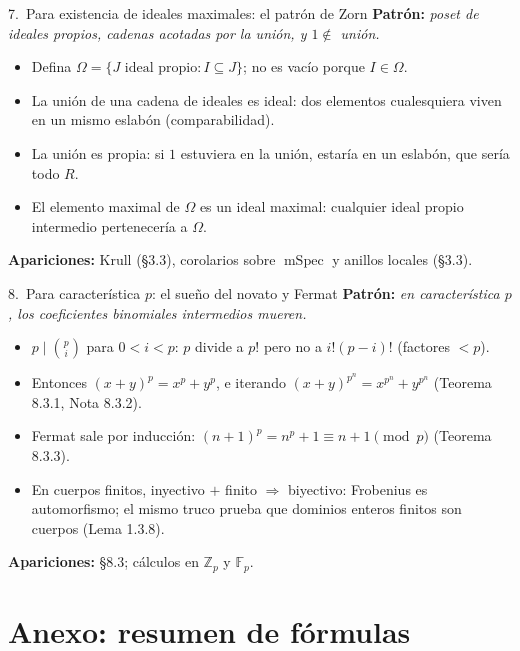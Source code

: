 \documentclass[11pt,twoside]{article}
\DeclareMathOperator{\mSpec}{mSpec}
\newcommand{\Z}{\mathbb{Z}}
\newcommand{\F}{\mathbb{F}}
\begin{document}
\begin{strategybox}{7.\ Para existencia de ideales maximales: el patrón de Zorn}
\textbf{Patrón:} \textit{poset de ideales propios, cadenas acotadas por la unión, y $1 \notin$ unión.}
\begin{itemize}[leftmargin=1.5em]
\item Defina $\Omega = \{J \text{ ideal propio} : I \subseteq J\}$; no es vacío porque $I \in \Omega$.
\item La unión de una cadena de ideales es ideal: dos elementos cualesquiera viven en un mismo eslabón (comparabilidad).
\item La unión es propia: si $1$ estuviera en la unión, estaría en un eslabón, que sería todo $R$.
\item El elemento maximal de $\Omega$ es un ideal maximal: cualquier ideal propio intermedio pertenecería a $\Omega$.
\end{itemize}
\textbf{Apariciones:} Krull (§3.3), corolarios sobre $\mSpec$ y anillos locales (§3.3).
\end{strategybox}

\begin{strategybox}{8.\ Para característica $p$: el sueño del novato y Fermat}
\textbf{Patrón:} \textit{en característica $p$, los coeficientes binomiales intermedios mueren.}
\begin{itemize}[leftmargin=1.5em]
\item $p \mid \binom{p}{i}$ para $0 < i < p$: $p$ divide a $p!$ pero no a $i!(p-i)!$ (factores $< p$).
\item Entonces $(x + y)^{p} = x^{p} + y^{p}$, e iterando $(x+y)^{p^{n}} = x^{p^{n}} + y^{p^{n}}$ (Teorema 8.3.1, Nota 8.3.2).
\item Fermat sale por inducción: $(n+1)^{p} = n^{p} + 1 \equiv n + 1 \pmod{p}$ (Teorema 8.3.3).
\item En cuerpos finitos, inyectivo $+$ finito $\Rightarrow$ biyectivo: Frobenius es automorfismo; el mismo truco prueba que dominios enteros finitos son cuerpos (Lema 1.3.8).
\end{itemize}
\textbf{Apariciones:} §8.3; cálculos en $\Z_{p}$ y $\F_{p}$.
\end{strategybox}

\newpage
\section{Anexo: resumen de fórmulas}
\end{document}
